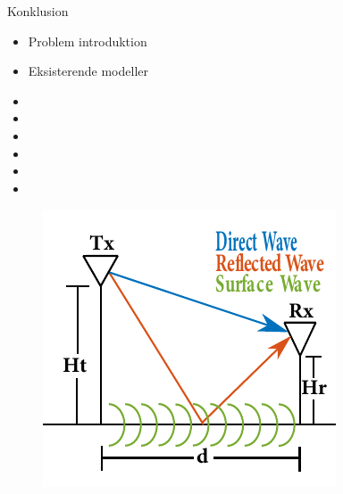 \begin{frame}{Konklusion}
	\begin{minipage}{0.5\textwidth}
		\begin{itemize}
		\item Problem introduktion
		\item Eksisterende modeller
		\item[] 
		\item[] 
		\item[] 
		\item[] 
		\item[] 
		\item[] 
		\end{itemize}
	\end{minipage}%
	\begin{minipage}{0.5\textwidth}
		\begin{figure}[H]
			\centering
			\includegraphics[width=\columnwidth]{figures/poster_cropped_1.pdf}
		\end{figure}
	\end{minipage}%
\end{frame}

